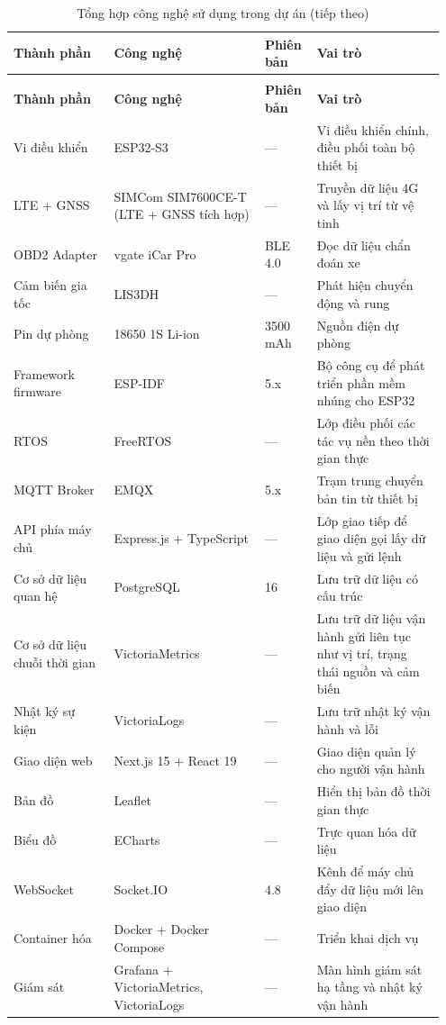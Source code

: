 \documentclass[a4paper]{extarticle}
\newcommand{\thesissettableid}[2]{%
  \renewcommand{\thetable}{#1}%
  \renewcommand{\theHtable}{#2}%
}
\begin{document}
{\thesissettableid{1.3}{tab-ch1-technology-stack-summary}
\def\LTcaptype{table}
\begin{longtable}{|L{0.223\linewidth}|L{0.334\linewidth}|L{0.115\linewidth}|L{0.282\linewidth}|}
\caption{Tổng hợp công nghệ sử dụng trong dự án}\label{tab:ch1-technology-stack-summary}\\
\hline \textbf{Thành phần} & \textbf{Công nghệ} & \textbf{Phiên bản} & \textbf{Vai trò} \\
\hline
\endfirsthead
\caption[]{Tổng hợp công nghệ sử dụng trong dự án (tiếp theo)}\\
\hline \textbf{Thành phần} & \textbf{Công nghệ} & \textbf{Phiên bản} & \textbf{Vai trò} \\
\hline
\endhead
\hline
\endfoot
\endlastfoot
Vi điều khiển & ESP32-S3 & --- & Vi điều khiển chính, điều phối toàn bộ
thiết bị \\\hline
LTE + GNSS & SIMCom SIM7600CE-T (LTE + GNSS tích hợp) & --- & Truyền dữ
liệu 4G và lấy vị trí từ vệ tinh \\\hline
OBD2 Adapter & vgate iCar Pro & BLE 4.0 & Đọc dữ liệu chẩn đoán xe \\\hline
Cảm biến gia tốc & LIS3DH & --- & Phát hiện chuyển động và rung \\\hline
Pin dự phòng & 18650 1S Li-ion & 3500 mAh & Nguồn điện dự phòng \\\hline
Framework firmware & ESP-IDF & 5.x & Bộ công cụ để phát triển phần mềm
nhúng cho ESP32 \\\hline
RTOS & FreeRTOS & --- & Lớp điều phối các tác vụ nền theo thời gian thực \\\hline
MQTT Broker & EMQX & 5.x & Trạm trung chuyển bản tin từ thiết bị \\\hline
API phía máy chủ & Express.js + TypeScript & --- & Lớp giao tiếp để
giao diện gọi lấy dữ liệu và gửi lệnh \\\hline
Cơ sở dữ liệu quan hệ & PostgreSQL & 16 & Lưu trữ dữ liệu có cấu trúc \\\hline
Cơ sở dữ liệu chuỗi thời gian & VictoriaMetrics & --- & Lưu trữ
dữ liệu vận hành gửi liên tục như vị trí, trạng thái nguồn và cảm biến \\\hline
Nhật ký sự kiện & VictoriaLogs & --- & Lưu trữ nhật ký vận hành và lỗi \\\hline
Giao diện web & Next.js 15 + React 19 & --- & Giao diện quản lý cho
người vận hành \\\hline
Bản đồ & Leaflet & --- & Hiển thị bản đồ thời gian thực \\\hline
Biểu đồ & ECharts & --- & Trực quan hóa dữ liệu \\\hline
WebSocket & Socket.IO & 4.8 & Kênh để máy chủ đẩy dữ liệu mới lên giao
diện \\\hline
Container hóa & Docker + Docker Compose & --- & Triển khai dịch vụ \\\hline
Giám sát & Grafana + VictoriaMetrics, VictoriaLogs & --- & Màn hình giám
sát hạ tầng và nhật ký vận hành \\\hline
\end{longtable}
}
\end{document}
